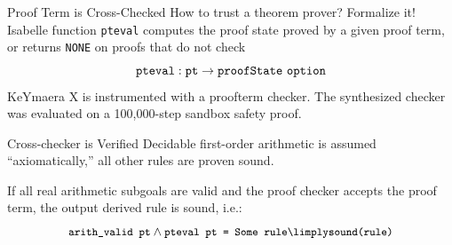 \documentclass[slidestop,aspectratio=169]{beamer}
\providecommand{\KeYmaeraX}{KeYmaera X\xspace}
\newcommand{\Isabelle}{Isabelle\xspace}
\theoremstyle{plain}
\theoremstyle{definition}
\theoremstyle{remark}
\begin{document}
\begin{frame}[t]{Proof Term is Cross-Checked}
How to trust a theorem prover?
Formalize it!
\Isabelle function \texttt{pteval} computes the proof state proved by a given proof term, or returns \texttt{NONE} on proofs that do not check
\[{\tt pteval} : {\tt pt} \to {\tt proofState\ option}\]
\KeYmaeraX is instrumented with a proofterm checker.
The synthesized checker was evaluated on a 100,000-step sandbox safety proof.
\end{frame}

\begin{frame}[t]{Cross-checker is Verified}
Decidable first-order arithmetic is assumed ``axiomatically,'' all other rules are proven sound.
\begin{theorem}
If all real arithmetic subgoals are valid and the proof checker accepts the proof term, the output derived rule is sound, i.e.:
\[\small\texttt{arith\_valid pt} \land \texttt{pteval\ pt = Some rule} \limply \texttt{sound(rule)}\]
\end{theorem}
\end{frame}
\end{document}
